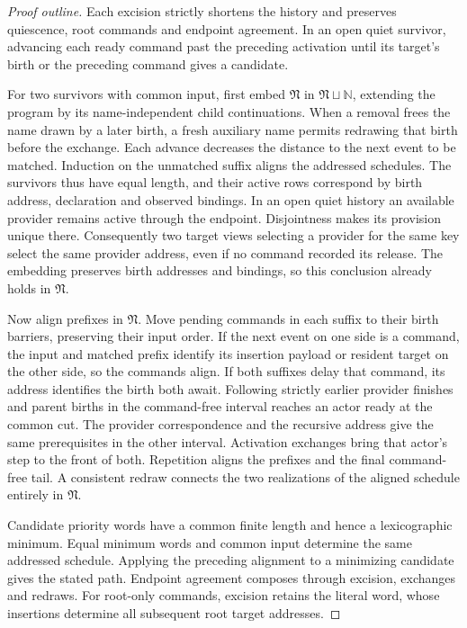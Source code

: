 \documentclass[11pt,a4paper]{article}
\theoremstyle{definition}
\theoremstyle{plain}
\newcommand{\N}{\mathfrak{N}}
\begin{document}
\begin{proof}[Proof outline]
Each excision strictly shortens the history and preserves quiescence, root commands and endpoint agreement. In an open quiet survivor, advancing each ready command past the preceding activation until its target's birth or the preceding command gives a candidate.

For two survivors with common input, first embed $\N$ in $\N\sqcup\mathbb N$, extending the program by its name-independent child continuations. When a removal frees the name drawn by a later birth, a fresh auxiliary name permits redrawing that birth before the exchange. Each advance decreases the distance to the next event to be matched. Induction on the unmatched suffix aligns the addressed schedules. The survivors thus have equal length, and their active rows correspond by birth address, declaration and observed bindings. In an open quiet history an available provider remains active through the endpoint. Disjointness makes its provision unique there. Consequently two target views selecting a provider for the same key select the same provider address, even if no command recorded its release. The embedding preserves birth addresses and bindings, so this conclusion already holds in $\N$.

Now align prefixes in $\N$. Move pending commands in each suffix to their birth barriers, preserving their input order. If the next event on one side is a command, the input and matched prefix identify its insertion payload or resident target on the other side, so the commands align. If both suffixes delay that command, its address identifies the birth both await. Following strictly earlier provider finishes and parent births in the command-free interval reaches an actor ready at the common cut. The provider correspondence and the recursive address give the same prerequisites in the other interval. Activation exchanges bring that actor's step to the front of both. Repetition aligns the prefixes and the final command-free tail. A consistent redraw connects the two realizations of the aligned schedule entirely in $\N$.

Candidate priority words have a common finite length and hence a lexicographic minimum. Equal minimum words and common input determine the same addressed schedule. Applying the preceding alignment to a minimizing candidate gives the stated path. Endpoint agreement composes through excision, exchanges and redraws. For root-only commands, excision retains the literal word, whose insertions determine all subsequent root target addresses.
\end{proof}
\end{document}
